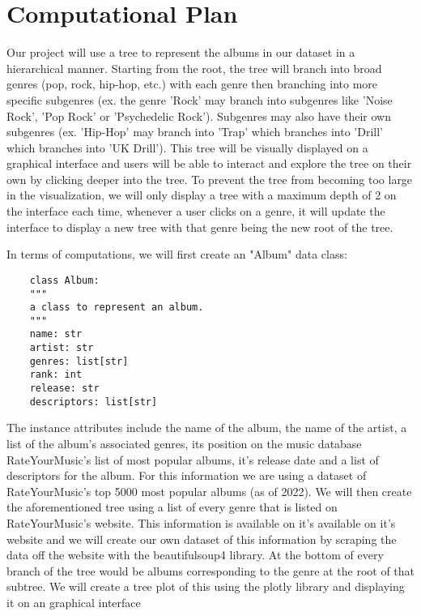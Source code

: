 \documentclass[fontsize=11pt]{article}
\begin{document}
\section*{Computational Plan}
Our project will use a tree to represent the albums in our dataset in a hierarchical manner. Starting from the root, the tree will branch into broad genres (pop, rock, hip-hop, etc.) with each genre then branching into more specific subgenres (ex. the genre 'Rock' may branch into subgenres like 'Noise Rock', 'Pop Rock' or 'Psychedelic Rock'). Subgenres may also have their own subgenres (ex. 'Hip-Hop' may branch into 'Trap' which branches into 'Drill' which branches into 'UK Drill'). This tree will be visually displayed on a graphical interface and users will be able to interact and explore the tree on their own by clicking deeper into the tree. To prevent the tree from becoming too large in the visualization, we will only display a tree with a maximum depth of 2 on the interface each time, whenever a user clicks on a genre, it will update the interface to display a new tree with that genre being the new root of the tree. 

In terms of computations, we will first create an "Album" data class:
\begin{verbatim}
	class Album:
    """
    a class to represent an album.
    """
    name: str
    artist: str  
    genres: list[str]
    rank: int
    release: str
    descriptors: list[str]
\end{verbatim}
The instance attributes include the name of the album, the name of the artist, a list of the album's associated genres, its position on the music database RateYourMusic's list of most popular albums, it's release date and a list of descriptors for the album. For this information we are using a dataset of RateYourMusic's top 5000 most popular albums (as of 2022). We will then create the aforementioned tree using a list of every genre that is listed on RateYourMusic's website. This information is available on it's available on it's website and we will create our own dataset of this information by scraping the data off the website with the beautifulsoup4 library. At the bottom of every branch of the tree would be albums corresponding to the genre at the root of that subtree. We will create a tree plot of this using the plotly library and displaying it on an graphical interface



 
\end{document}
